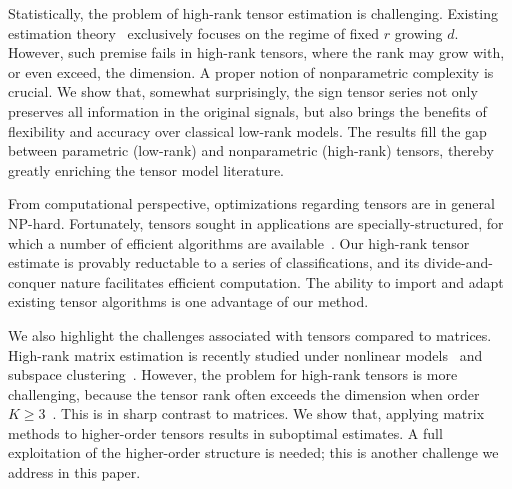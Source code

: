 \documentclass[11pt]{article}
\theoremstyle{plain}
\theoremstyle{definition}
\begin{document}
Statistically, the problem of high-rank tensor estimation is challenging. Existing estimation theory~\citep{anandkumar2014tensor,montanari2018spectral,cai2019nonconvex} exclusively focuses on the regime of fixed $r$ growing $d$. However, such premise fails in high-rank tensors, where the rank may grow with, or even exceed, the dimension. A proper notion of nonparametric complexity is crucial. We show that, somewhat surprisingly, the sign tensor series not only preserves all information in the original signals, but also brings the benefits of flexibility and accuracy over classical low-rank models. The results fill the gap between parametric (low-rank) and nonparametric (high-rank) tensors, thereby greatly enriching the tensor model literature. 

From computational perspective, optimizations regarding tensors are in general NP-hard. Fortunately, tensors sought in applications are specially-structured, for which a number of efficient algorithms are available~\citep{ghadermarzy2018learning,wang2018learning, han2020optimal}. Our high-rank tensor estimate is provably reductable to a series of classifications, and its divide-and-conquer nature facilitates efficient computation. The ability to import and adapt existing tensor algorithms is one advantage of our method. 

We also highlight the challenges associated with tensors compared to matrices. High-rank matrix estimation is recently studied under nonlinear models~\citep{ganti2015matrix} and subspace clustering~\citep{pmlr-v70-ongie17a,fan2019online}. However, the problem for high-rank tensors is more challenging, because the tensor rank often exceeds the dimension when order $K\geq 3$~\citep{anandkumar2017analyzing}. This is in sharp contrast to matrices. We show that, applying matrix methods to higher-order tensors results in suboptimal estimates. A full exploitation of the higher-order structure is needed; this is another challenge we address in this paper.
\end{document}
